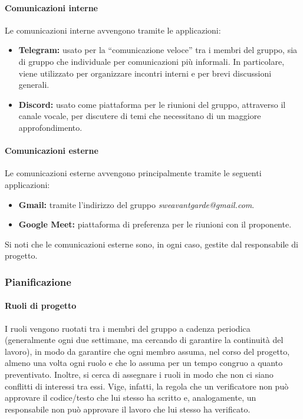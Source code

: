 \paragraph{Comunicazioni interne}
Le comunicazioni interne avvengono tramite le applicazioni:
\begin{itemize}
    \item \textbf{Telegram:} usato per la ``comunicazione veloce'' tra i membri del gruppo, sia di gruppo che individuale per comunicazioni più informali. In particolare, viene utilizzato per organizzare incontri interni e per brevi discussioni generali.
    \item \textbf{Discord:} usato come piattaforma per le riunioni del gruppo, attraverso il canale vocale, per discutere di temi che necessitano di un maggiore approfondimento.
\end{itemize}

\paragraph{Comunicazioni esterne}
Le comunicazioni esterne avvengono principalmente tramite le seguenti applicazioni:
\begin{itemize}
    \item \textbf{Gmail:} tramite l’indirizzo del gruppo \textit{sweavantgarde@gmail.com}.
    \item \textbf{Google Meet:} piattaforma di preferenza per le riunioni con il proponente.
\end{itemize}
Si noti che le comunicazioni esterne sono, in ogni caso, gestite dal responsabile di progetto. 

\subsubsection{Pianificazione}
\paragraph{Ruoli di progetto}\label{sec:processi_organizzativi:gestione_processi:pianificazione}
I ruoli vengono ruotati tra i membri del gruppo a cadenza periodica (generalmente ogni due settimane, ma cercando di garantire la continuità del lavoro), in modo da garantire che ogni membro assuma, nel corso del progetto, almeno una volta ogni ruolo e che lo assuma per un tempo congruo a quanto preventivato. 
Inoltre, si cerca di assegnare i ruoli in modo che non ci siano conflitti di interessi tra essi. Vige, infatti, la regola che un verificatore non può approvare il codice/testo che lui stesso ha scritto e, analogamente, un responsabile non può approvare il lavoro che lui stesso ha verificato. 

